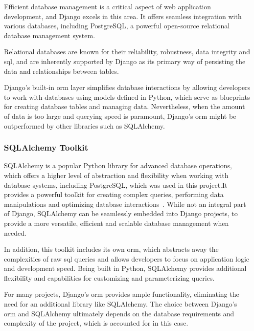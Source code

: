 Efficient database management is a critical aspect of web application development, and Django excels in this area. It offers seamless integration with various databases, including PostgreSQL, a powerful open-source relational database management system. 

Relational databases are known for their reliability, robustness, data integrity and \ac{sql}, and are inherently supported by Django as its primary way of persisting the data and relationships between tables.

Django's built-in \acs{orm} layer simplifies database interactions by allowing developers to work with databases using models defined in Python, which serve as blueprints for creating database tables and managing data. Nevertheless, when the amount of data is too large and querying speed is paramount, Django's \acs{orm} might be outperformed by other libraries such as SQLAlchemy.

\subsubsection{SQLAlchemy Toolkit}

SQLAlchemy is a popular Python library for advanced database operations, which offers a higher level of abstraction and flexibility when working with database systems, including PostgreSQL, which was used in this project.\@ It provides a powerful toolkit for creating complex queries, performing data manipulations and optimizing database interactions~\cite{SQLALCHEMY}. While not an integral part of Django, SQLAlchemy can be seamlessly embedded into Django projects, to provide a more versatile, efficient and scalable database management when needed.

In addition, this toolkit includes its own \acs{orm}, which abstracts away the complexities of raw \acs{sql} queries and allows developers to focus on application logic and development speed. Being built in Python, SQLAlchemy provides additional flexibility and capabilities for customizing and parameterizing queries.


For many projects, Django's \acs{orm} provides ample functionality, eliminating the need for an additional library like SQLAlchemy. The choice between Django's \acs{orm} and SQLAlchemy ultimately depends on the database requirements and complexity of the project, which is accounted for in this case.